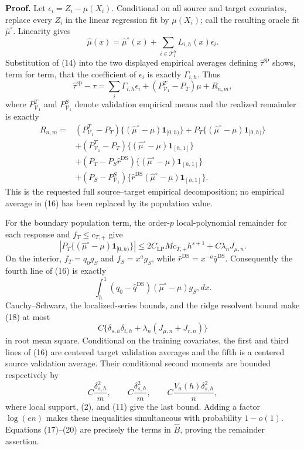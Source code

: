 \textbf{Proof.}
Let \(\epsilon_i=Z_i-\mu(X_i)\).  Conditional on all source and target covariates, replace every \(Z_i\) in the linear regression fit by \(\mu(X_i)\); call the resulting oracle fit \(\widehat\mu^\circ\).  Linearity gives
\[
 \widehat\mu(x)=\widehat\mu^\circ(x)+\sum_{i\in\mathcal T^S_1}L_{i,h}(x)\epsilon_i.
\tag{14}
\]
Substitution of (14) into the two displayed empirical averages defining \(\widehat\tau^{\mathrm{sp}}\) shows, term for term, that the coefficient of \(\epsilon_i\) is exactly \(\Gamma_{i,h}\).  Thus
\[
 \widehat\tau^{\mathrm{sp}}-\tau
 =\sum_i\Gamma_{i,h}\epsilon_i
 +(P^T_{\mathcal V_1}-P_T)\mu+R_{n,m},
\tag{15}
\]
where \(P^T_{\mathcal V_1}\) and \(P^S_{\mathcal V_1}\) denote validation empirical means and the realized remainder is exactly
\[
\begin{aligned}
R_{n,m}={}&(P^T_{\mathcal V_1}-P_T)
 \{(\widehat\mu^\circ-\mu)\mathbf1_{[0,h)}\}
 +P_T\{(\widehat\mu^\circ-\mu)\mathbf1_{[0,h)}\}\\
&+(P^T_{\mathcal V_1}-P_T)
 \{(\widehat\mu^\circ-\mu)\mathbf1_{[h,1]}\}\\
&+(P_T-P_S\widehat r^{\mathrm{DS}})
 \{(\widehat\mu^\circ-\mu)\mathbf1_{[h,1]}\}\\
&+(P_S-P^S_{\mathcal V_1})
 \{\widehat r^{\mathrm{DS}}(\widehat\mu^\circ-\mu)\mathbf1_{[h,1]}\}.
\end{aligned}
\tag{16}
\]
This is the requested full source--target empirical decomposition; no empirical average in (16) has been replaced by its population value.

For the boundary population term, the order-\(p\) local-polynomial remainder for each response and \(f_T\le c_{T,+}\) give
\[
 \left|P_T\{(\widehat\mu^\circ-\mu)\mathbf1_{[0,h)}\}\right|
 \le 2C_{\mathrm{LP}}Mc_{T,+}h^{s+1}+C\lambda_nJ_{\mu,n}.
\tag{17}
\]
On the interior, \(f_T=q_0g_S\) and \(f_S=x^ag_S\), while \(\widehat r^{\mathrm{DS}}=x^{-a}\widehat q^{\mathrm{DS}}\).  Consequently the fourth line of (16) is exactly
\[
 \int_h^1(q_0-\widehat q^{\mathrm{DS}})
 (\widehat\mu^\circ-\mu)g_S,dx.
\tag{18}
\]
Cauchy--Schwarz, the localized-series bounds, and the ridge resolvent bound make (18) at most
\[
 C\{\delta_{s,h}\delta_{t,h}+\lambda_n(J_{\mu,n}+J_{r,n})\}
\tag{19}
\]
in root mean square.  Conditional on the training covariates, the first and third lines of (16) are centered target validation averages and the fifth is a centered source validation average.  Their conditional second moments are bounded respectively by
\[
 C\frac{\delta_{s,h}^2}{m},
 \qquad
 C\frac{\delta_{s,h}^2}{m},
 \qquad
 C\frac{V_a(h)\delta_{s,h}^2}{n},
\tag{20}
\]
where local support, (2), and (11) give the last bound.  Adding a factor \(\log(en)\) makes these inequalities simultaneous with probability \(1-o(1)\).  Equations (17)--(20) are precisely the terms in \(\widehat B\), proving the remainder assertion.

